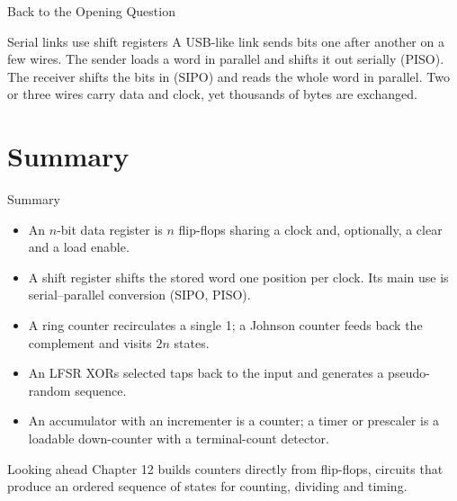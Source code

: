 \documentclass[9pt,aspectratio=169,xcolor=table]{beamer}
\begin{document}
\begin{frame}{Back to the Opening Question}
  \begin{block}{Serial links use shift registers}
    \small A USB-like link sends bits one after another on a few wires. The sender loads a word in parallel and shifts it out serially (\alert{PISO}). The receiver shifts the bits in (\alert{SIPO}) and reads the whole word in parallel. Two or three wires carry data and clock, yet thousands of bytes are exchanged.
  \end{block}
\end{frame}

\section{Summary}

\begin{frame}{Summary}
  \begin{itemize}\itemsep3pt\small
    \item An $n$-bit \alert{data register} is $n$ flip-flops sharing a clock and, optionally, a clear and a load enable.
    \item A \alert{shift register} shifts the stored word one position per clock. Its main use is serial--parallel conversion (SIPO, PISO).
    \item A \alert{ring counter} recirculates a single 1; a \alert{Johnson counter} feeds back the complement and visits $2n$ states.
    \item An \alert{LFSR} XORs selected taps back to the input and generates a pseudo-random sequence.
    \item An \alert{accumulator} with an incrementer is a counter; a timer or prescaler is a loadable down-counter with a terminal-count detector.
  \end{itemize}
  \begin{block}{Looking ahead}
    Chapter 12 builds counters directly from flip-flops, circuits that produce an ordered sequence of states for counting, dividing and timing.
  \end{block}
\end{frame}
\end{document}
